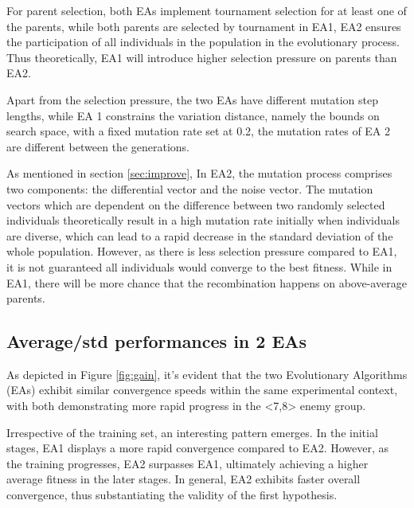 For parent selection, both EAs implement tournament selection for at least one of the parents, while both parents are selected by tournament in EA1, EA2 ensures the participation of all individuals in the population in the evolutionary process. Thus theoretically, EA1 will introduce higher selection pressure on parents than EA2.

Apart from the selection pressure, the two EAs have different mutation step lengths, while EA 1 constrains the variation distance, namely the bounds on search space, with a fixed mutation rate set at 0.2, the mutation rates of EA 2 are different between the generations.

As mentioned in section \ref{sec:improve}, In EA2, the mutation process comprises two components: the differential vector and the noise vector. The mutation vectors which are dependent on the difference between two randomly selected individuals theoretically result in a high mutation rate initially when individuals are diverse, which can lead to a rapid decrease in the standard deviation of the whole population. However, as there is less selection pressure compared to EA1, it is not guaranteed all individuals would converge to the best fitness. While in EA1, there will be more chance that the recombination happens on above-average parents.



\subsection{Average/std performances in 2 EAs}
As depicted in Figure \ref{fig:gain}, it's evident that the two Evolutionary Algorithms (EAs) exhibit similar convergence speeds within the same experimental context, with both demonstrating more rapid progress in the <7,8> enemy group.

Irrespective of the training set, an interesting pattern emerges. In the initial stages, EA1 displays a more rapid convergence compared to EA2. However, as the training progresses, EA2 surpasses EA1, ultimately achieving a higher average fitness in the later stages. In general, EA2 exhibits faster overall convergence, thus substantiating the validity of the first hypothesis.

